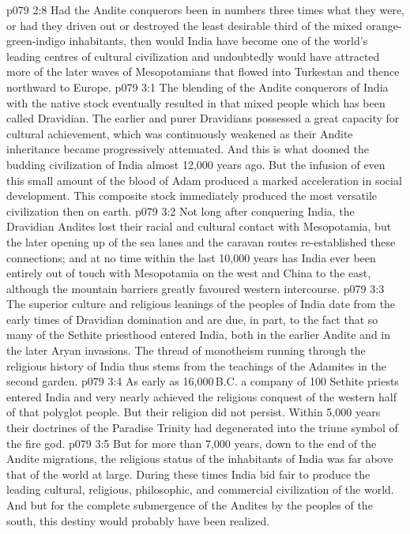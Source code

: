 \vs p079 2:8 Had the Andite conquerors been in numbers three times what they were, or had they driven out or destroyed the least desirable third of the mixed orange\hyp{}green\hyp{}indigo inhabitants, then would India have become one of the world’s leading centres of cultural civilization and undoubtedly would have attracted more of the later waves of Mesopotamians that flowed into Turkestan and thence northward to Europe.
\vs p079 3:1 The blending of the Andite conquerors of India with the native stock eventually resulted in that mixed people which has been called Dravidian. The earlier and purer Dravidians possessed a great capacity for cultural achievement, which was continuously weakened as their Andite inheritance became progressively attenuated. And this is what doomed the budding civilization of India almost 12,000 years ago. But the infusion of even this small amount of the blood of Adam produced a marked acceleration in social development. This composite stock immediately produced the most versatile civilization then on earth.
\vs p079 3:2 Not long after conquering India, the Dravidian Andites lost their racial and cultural contact with Mesopotamia, but the later opening up of the sea lanes and the caravan routes re\hyp{}established these connections; and at no time within the last 10,000 years has India ever been entirely out of touch with Mesopotamia on the west and China to the east, although the mountain barriers greatly favoured western intercourse.
\vs p079 3:3 \pc The superior culture and religious leanings of the peoples of India date from the early times of Dravidian domination and are due, in part, to the fact that so many of the Sethite priesthood entered India, both in the earlier Andite and in the later Aryan invasions. The thread of monotheism running through the religious history of India thus stems from the teachings of the Adamites in the second garden.
\vs p079 3:4 As early as 16,000\,B.C. a company of 100 Sethite priests entered India and very nearly achieved the religious conquest of the western half of that polyglot people. But their religion did not persist. Within 5,000 years their doctrines of the Paradise Trinity had degenerated into the triune symbol of the fire god.
\vs p079 3:5 But for more than 7,000 years, down to the end of the Andite migrations, the religious status of the inhabitants of India was far above that of the world at large. During these times India bid fair to produce the leading cultural, religious, philosophic, and commercial civilization of the world. And but for the complete submergence of the Andites by the peoples of the south, this destiny would probably have been realized.
